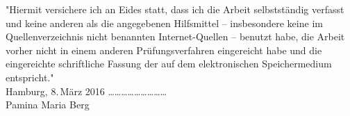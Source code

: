 \documentclass[paper=a4, DIV=13, BCOR=12mm, twoside=on, onecolumn=on, open = any, titlepage =on, parskip =half-, headsepline = on, footsepline = on, chapterprefix = on, sectionprefix = on, appendixprefix = off, fontsize = 11pt, numbers = noenddot, abstract = off]{scrreprt}
\begin{document}
\cleardoublepage
\newpage
\thispagestyle{empty}
\vspace*{\fill}
"Hiermit versichere ich an Eides statt, dass ich die Arbeit selbstständig verfasst und keine anderen als die angegebenen Hilfsmittel – insbesondere keine im Quellenverzeichnis nicht benannten Internet-Quellen – benutzt habe, die Arbeit vorher nicht in einem anderen Prüfungsverfahren eingereicht habe und die eingereichte schriftliche Fassung der auf dem elektronischen Speichermedium entspricht."\\

Hamburg, 8.\,März 2016 \hspace*{\fill} \dots \dots \dots \dots \dots \dots \dots \dots \dots\\
\hspace*{\fill} Pamina Maria Berg \quad $\,$
\end{document}
